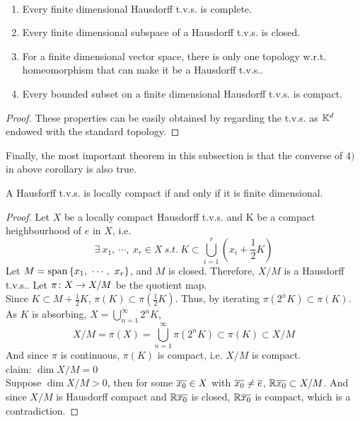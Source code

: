 \documentclass[a4paper,11pt]{report}
\begin{document}
\begin{cor}
	~
	\begin{enumerate}[label=\arabic*)]
		\item Every finite dimensional Hausdorff t.v.s. is complete.
		\item Every finite dimensional subspace of a Hausdorff t.v.s. is closed.
		\item For a finite dimensional vector space, there is only one topology w.r.t. homeomorphism that can make it be a Hausdorff t.v.s..
		\item Every bounded subset on a finite dimensional Hausdorff t.v.s. is compact.
	\end{enumerate}
\end{cor}
\begin{proof}
	These properties can be easily obtained by regarding the t.v.s. as $\mathbb{K}^{d}$ endowed with the standard topology.
\end{proof}

Finally, the most important theorem in this subsection is that the converse of $4)$ in above corollary is also true.
\begin{thm}
	A Hausforff t.v.s. is locally compact if and only if it is finite dimensional.
\end{thm}
\begin{proof}
	Let $X$ be a locally compact Hausdorff t.v.s. and K be a compact heighbourhood of $e$ in $X$, i.e.
	\begin{equation*}
		\exists ~ x_1,~ \cdots,~ x_r \in X ~s.t.~ K \subset \bigcup_{i=1}^{r}(x_i+\frac{1}{2}K)
	\end{equation*}
	Let $M = \operatorname{span}{\{x_1,~ \cdots,~ x_r\}}$, and $M$ is closed. Therefore, $X/M$ is a Hausdorff t.v.s.. Let $\pi \colon X \rightarrow X/M$ be the quotient map.\\
	Since $K \subset M+\frac{1}{2}K$, $\pi(K) \subset \pi(\frac{1}{2}K)$. Thus, by iterating $\pi(2^{n}K) \subset \pi(K)$.\\
	As $K$ is absorbing, $X = \bigcup_{n=1}^{\infty}2^{n}K$,
	\begin{equation*}
		X/M = \pi(X) = \bigcup_{n=1}^{\infty}\pi(2^{n}K) \subset \pi(K) \subset X/M
	\end{equation*}
	And since $\pi$ is continuous, $\pi(K)$ is compact, i.e. $X/M$ is compact.\\
	claim: $\dim{X/M} = 0$ \\
	Suppose $\dim{X/M} > 0$, then for some $\overline{x_0} \in X$ with $\overline{x_0} \neq \overline{e}$, $\mathbb{R} \overline{x_0} \subset X/M$. And since $X/M$ is Hausdorff compact and $\mathbb{R} \overline{x_0}$ is closed, $\mathbb{R} \overline{x_0}$ is compact, which is a contradiction.
\end{proof}
\end{document}
